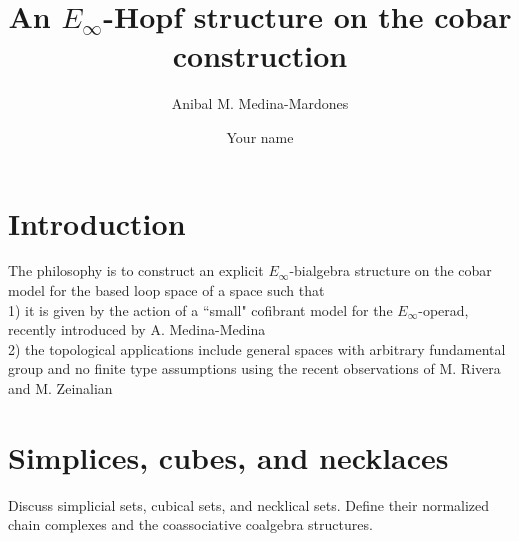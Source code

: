 \documentclass{amsart}
\begin{document}
\title{An $E_\infty$-Hopf structure on the cobar construction}
\author{Anibal M. Medina-Mardones}
\address{Max Plank Institute for Mathematics, Bonn, Germany}
\address{Department of Mathematics, University of Notre Dame, Notre Dame, IN, USA}
\author{Your name}
\address{Your address}


\begin{abstract}
	
\end{abstract} 

\vspace*{-1cm}

\maketitle

\tableofcontents

\section{Introduction}
The philosophy is to construct an explicit $E_{\infty}$-bialgebra structure on the cobar model for the based loop space of a space such that
\\
1) it is given by the action of a ``small" cofibrant model for the $E_{\infty}$-operad, recently introduced by A. Medina-Medina
\\
2) the topological applications include general spaces with arbitrary fundamental group and no finite type assumptions using the recent observations of M. Rivera and M. Zeinalian 

\section{Simplices, cubes, and necklaces}

Discuss simplicial sets, cubical sets, and necklical sets. Define their normalized chain complexes and the coassociative coalgebra structures.
\end{document}
